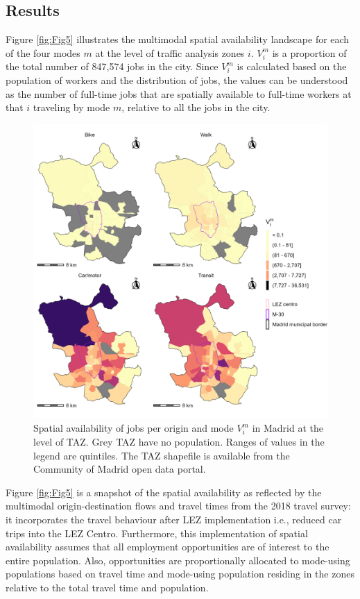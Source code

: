 \documentclass[10pt,letterpaper]{article}
\begin{document}
\hypertarget{results}{%
\subsection{Results}\label{results}}

Figure \ref{fig:Fig5} illustrates the multimodal spatial availability
landscape for each of the four modes \(m\) at the level of traffic
analysis zones \(i\). \(V_i^m\) is a proportion of the total number of
847,574 jobs in the city. Since \(V_i^m\) is calculated based on the
population of workers and the distribution of jobs, the values can be
understood as the number of full-time jobs that are spatially available
to full-time workers at that \(i\) traveling by mode \(m\), relative to
all the jobs in the city.

\begin{figure}

{\centering \includegraphics[width=0.85\linewidth]{images/Fig5} 

}

\caption{\label{fig:Fig5} Spatial availability of jobs per origin and mode $V_i^m$ in Madrid at the level of TAZ. Grey TAZ have no population. Ranges of values in the legend are quintiles. The TAZ shapefile is available from the Community of Madrid open data portal.}\label{fig:SA-m-plot}
\end{figure}

Figure \ref{fig:Fig5} is a snapshot of the spatial availability as
reflected by the multimodal origin-destination flows and travel times
from the 2018 travel survey: it incorporates the travel behaviour after
LEZ implementation i.e., reduced car trips into the LEZ Centro.
Furthermore, this implementation of spatial availability assumes that
all employment opportunities are of interest to the entire population.
Also, opportunities are proportionally allocated to mode-using
populations based on travel time and mode-using population residing in
the zones relative to the total travel time and population.
\end{document}

